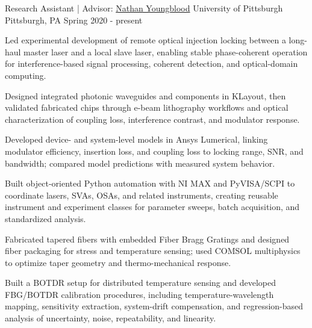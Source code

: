 
\begin{cventries}

  \cventry
    {Research Assistant | Advisor: \href{https://pitt-photonics.github.io/}{Nathan Youngblood}}
    {University of Pittsburgh}
    {Pittsburgh, PA}
    {Spring 2020 - present}
    {
      \begin{cvitems}
        \item {Led experimental development of remote optical injection locking between a long-haul master laser and a local slave laser, enabling stable phase-coherent operation for interference-based signal processing, coherent detection, and optical-domain computing.}
        \item {Designed integrated photonic waveguides and components in KLayout, then validated fabricated chips through e-beam lithography workflows and optical characterization of coupling loss, interference contrast, and modulator response.}
        \item {Developed device- and system-level models in Ansys Lumerical, linking modulator efficiency, insertion loss, and coupling loss to locking range, SNR, and bandwidth; compared model predictions with measured system behavior.}
        \item {Built object-oriented Python automation with NI MAX and PyVISA/SCPI to coordinate lasers, SVAs, OSAs, and related instruments, creating reusable instrument and experiment classes for parameter sweeps, batch acquisition, and standardized analysis.}
        \item {Fabricated tapered fibers with embedded Fiber Bragg Gratings and designed fiber packaging for stress and temperature sensing; used COMSOL multiphysics to optimize taper geometry and thermo-mechanical response.}
        \item {Built a BOTDR setup for distributed temperature sensing and developed FBG/BOTDR calibration procedures, including temperature-wavelength mapping, sensitivity extraction, system-drift compensation, and regression-based analysis of uncertainty, noise, repeatability, and linearity.}
      \end{cvitems}
    }


\end{cventries}
